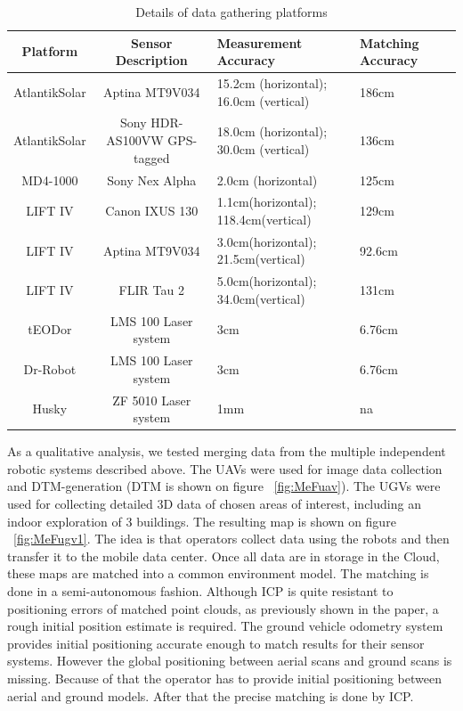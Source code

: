 \documentclass{article}
\begin{document}
\begin{table}[h!]
\centering
\begin{tabular}{| c | c | p{3cm} | p{2cm} | p{2cm} |}
\hline
Platform & Sensor Description & Measurement Accuracy & Matching Accuracy\\
\hline
AtlantikSolar & Aptina MT9V034 & 15.2cm (horizontal); 16.0cm (vertical) &186cm\\ \hline
AtlantikSolar & Sony HDR-AS100VW GPS-tagged & 18.0cm (horizontal); 30.0cm (vertical) &  136cm \\ \hline
MD4-1000 & Sony Nex Alpha & 2.0cm (horizontal) &125cm\\ \hline
LIFT IV & Canon IXUS 130 & 1.1cm(horizontal); 118.4cm(vertical) &129cm\\
LIFT IV & Aptina MT9V034 & 3.0cm(horizontal); 21.5cm(vertical) &92.6cm\\
LIFT IV & FLIR Tau 2 & 5.0cm(horizontal); 34.0cm(vertical) &131cm\\ \hline
tEODor & LMS 100 Laser system & 3cm &6.76cm\\ \hline
Dr-Robot & LMS 100 Laser system & 3cm &6.76cm\\ \hline
Husky & ZF 5010 Laser system & 1mm & na\\ \hline
\end{tabular}
\caption{Details of data gathering platforms}
\label{table:sourcesMEF}
\end{table}
As a qualitative analysis, we tested merging data from the multiple independent robotic systems described above.
The UAVs were used for image data collection and DTM-generation (DTM is shown on figure ~\ref{fig:MeFuav}).
The UGVs were used for collecting detailed 3D data of chosen areas of interest, including an indoor exploration of 3 buildings.
The resulting map is shown on figure ~\ref{fig:MeFugv1}.
The idea is that operators collect data using the robots and then transfer it to the mobile data center.
Once all data are in storage in the Cloud, these maps are matched into a common environment model.
The matching is done in a semi-autonomous fashion.
Although ICP is quite resistant to positioning errors of matched point clouds, as previously shown in the paper, a rough initial position estimate is required.
The ground vehicle odometry system provides initial positioning accurate enough to match results for their sensor systems.
However the global positioning between aerial scans and ground scans is missing.
Because of that the operator has to provide initial positioning between aerial and ground models. After that the precise matching is done by ICP.
\end{document}
